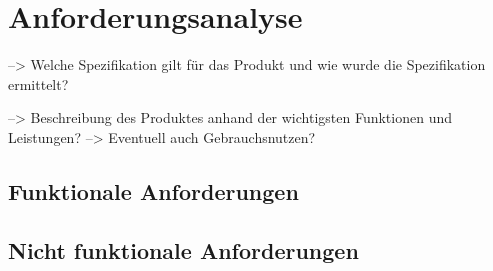 \chapter{Anforderungsanalyse} \label{anforderungsanalyse}

--> Welche Spezifikation gilt für das Produkt und wie wurde die Spezifikation ermittelt?

--> Beschreibung des Produktes anhand der wichtigsten Funktionen und Leistungen? --> Eventuell auch Gebrauchsnutzen?

\section{Funktionale Anforderungen} 



\section{Nicht funktionale Anforderungen}





